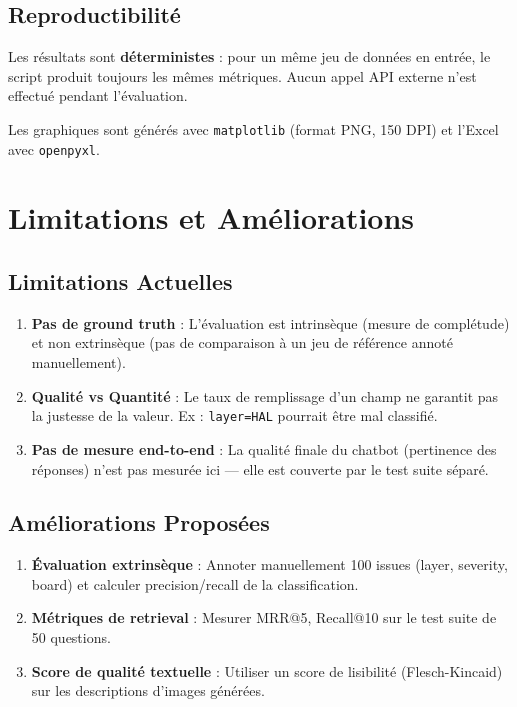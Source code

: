 \documentclass[a4paper,12pt]{article}
\begin{document}
\subsection{Reproductibilité}

Les résultats sont \textbf{déterministes} : pour un même jeu de données en entrée, le script produit toujours les mêmes métriques. Aucun appel API externe n'est effectué pendant l'évaluation.

Les graphiques sont générés avec \texttt{matplotlib} (format PNG, 150 DPI) et l'Excel avec \texttt{openpyxl}.

\section{Limitations et Améliorations}

\subsection{Limitations Actuelles}

\begin{enumerate}
    \item \textbf{Pas de ground truth} : L'évaluation est intrinsèque (mesure de complétude) et non extrinsèque (pas de comparaison à un jeu de référence annoté manuellement).
    \item \textbf{Qualité vs Quantité} : Le taux de remplissage d'un champ ne garantit pas la justesse de la valeur. Ex : \texttt{layer=HAL} pourrait être mal classifié.
    \item \textbf{Pas de mesure end-to-end} : La qualité finale du chatbot (pertinence des réponses) n'est pas mesurée ici — elle est couverte par le test suite séparé.
\end{enumerate}

\subsection{Améliorations Proposées}

\begin{enumerate}
    \item \textbf{Évaluation extrinsèque} : Annoter manuellement 100 issues (layer, severity, board) et calculer precision/recall de la classification.
    \item \textbf{Métriques de retrieval} : Mesurer MRR@5, Recall@10 sur le test suite de 50 questions.
    \item \textbf{Score de qualité textuelle} : Utiliser un score de lisibilité (Flesch-Kincaid) sur les descriptions d'images générées.
\end{enumerate}
\end{document}
